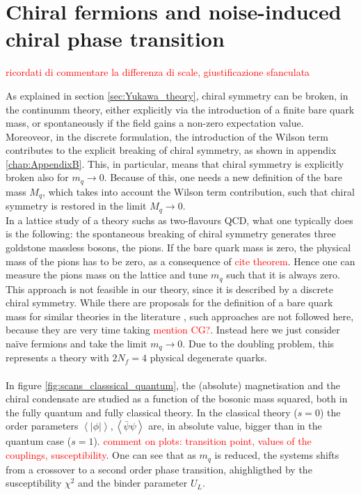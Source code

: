 \newpage



\newpage
\section{Chiral fermions and noise-induced chiral phase transition}
\label{sec:chiral_PT}
\textcolor{red}{ricordati di commentare la differenza di scale, giustificazione sfanculata}

\cite{Iwasaki:1994gq}
As explained in section \ref{sec:Yukawa_theory}, chiral symmetry can be broken, in the continumm theory, either explicitly via the introduction of a finite bare quark mass, or spontaneously if the field gains a non-zero expectation value.\\
Moreoveor, in the discrete formulation, the introduction of the Wilson term contributes to the explicit breaking of chiral symmetry, as shown in appendix \ref{chap:AppendixB}. This, in particular, means that chiral symmetry is explicitly broken also for $m_q \to 0$. Because of this, one needs a new definition of the bare mass $M_q$, which takes into account the Wilson term contribution, such that chiral symmetry is restored in the limit $M_q \to 0$. \\
In a lattice study of a theory suchs as  two-flavours QCD, what one typically does is \cite{rothe_LGT,gattringer_LQCD} the following: the spontaneous breaking of chiral symmetry generates three goldstone massless bosons, the pions. If the bare quark mass is zero, the physical mass of the pions has to be zero, as a consequence of \textcolor{red}{cite theorem}. Hence one can measure the pions mass on the lattice and tune $m_q$ such that it is  always zero. \\
This approach is not feasible in our theory, since it is described by a discrete chiral symmetry. While there are proposals for the definition of a bare quark mass for similar theories in the literature \cite{Iwasaki:1994gq,MAIANI1986265}, such approaches are not followed here, because they are very time taking \textcolor{red}{mention CG?}.  Instead here we just consider na\"ive fermions and take the limit $m_q \to 0$. Due to the doubling problem, this represents a theory with $2N_f = 4$ physical degenerate quarks. \\~\\
In figure \ref{fig:scans_classsical_quantum}, the (absolute) magnetisation and the chiral condensate are studied as a function of the bosonic mass squared, both in the fully quantum and fully classical theory. In the classical theory ($s=0$) the order parameters $\left\langle|\phi|\right\rangle, \left\langle\bar\psi \psi\right\rangle$ are, in absolute value, bigger than in the quantum case ($s=1$).  \textcolor{red}{comment on plots: transition point, values of the couplings, susceptibility}. One can see that as $m_q$ is reduced, the systems shifts from a crossover to a second order phase transition, ahighligthed by the susceptibility $\chi^2$ and the binder parameter $U_L$.
